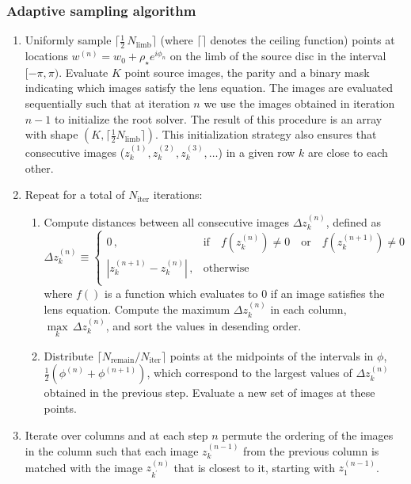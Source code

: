 \documentclass[12pt,dvipsnames]{report}
\begin{document}
\subsubsection{Adaptive sampling algorithm}
\begin{enumerate}
    \item Uniformly sample $\lceil\frac{1}{2}\,N_\mathrm{limb}\rceil$ (where $\lceil\rceil$ 
    denotes the ceiling function) points at locations 
    $w^{(n)}=w_0 + \rho_\star e^{i\phi_n}$ on the limb of the source disc  in 
    the interval $[-\pi,\pi)$. Evaluate $K$ point source images, the parity and a binary
    mask indicating which images satisfy the lens equation. 
    The images are evaluated sequentially such that at iteration
    $n$ we use the images obtained in iteration $n-1$ to initialize the root solver.
    The result of this procedure is an array with shape 
     $(K, \lceil\frac{1}{2}N_\mathrm{limb}\rceil)$. This initialization strategy also 
     ensures that consecutive images ($z^{(1)}_k, z^{(2)}_k, z^{(3)}_k,\ldots$) in a given row $k$ 
     are close to each other. 
    \item Repeat for a total of $N_\mathrm{iter}$ iterations:
    \begin{enumerate}
    \item Compute distances between all consecutive images $\Delta z^{(n)}_k$, defined as
    \begin{equation}
    \Delta z^{(n)}_k  \equiv 
    \begin{cases} 
    0\,,& \text{if}\quad f\left(z^{(n)}_k\right)\neq 0\quad \text{or}\quad f\left(z^{(n+1)}_k\right)\neq 0\;\text{}\\
    |z^{(n+1)}_k - z^{(n)}_k|\,,&\text{otherwise}\\
    \end{cases} 
    \end{equation}
    where $f()$ is a function which evaluates to $0$ if an image satisfies the lens equation.
    Compute the maximum $\Delta z^{(n)}_k$ in each column, 
    $\underset{k}{\operatorname{max}}\,\Delta z^{(n)}_k$, and sort the values in desending 
    order. 
    \item Distribute $\lceil N_\mathrm{remain}/N_\mathrm{iter}\rceil$ points at the midpoints of the intervals 
    in $\phi$, $\frac{1}{2}(\phi^{(n)}+\phi^{(n+1)})$, which correspond to the largest values of
    $\Delta z^{(n)}_k$  obtained in the previous step. Evaluate a new set of images at these points.
\end{enumerate}
    \item Iterate over columns and at each step $n$ permute the ordering of the 
    images in the column such that each image $z^{(n-1)}_k$ from the previous column is 
    matched with  the image  $z^{(n)}_{k^\prime}$ that is closest to it, starting with $z^{(n-1)}_1$.
\end{enumerate}
\end{document}
